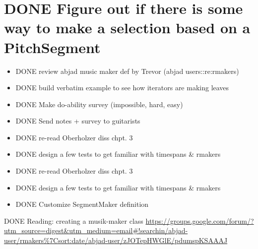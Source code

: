 \documentclass[11pt]{article}
\begin{document}
\section*{{\bfseries\sffamily DONE} Figure out if there is some way to make a selection based on a PitchSegment}
\label{sec:org51e59c8}
\begin{itemize}
\item DONE review abjad music maker def by Trevor (abjad users::re:rmakers)
\item DONE build verbatim example to see how iterators are making leaves
\end{itemize}
\begin{itemize}
\item DONE Make do-ability survey (impossible, hard, easy)
\item DONE Send notes + survey to guitarists
\end{itemize}


\begin{itemize}
\item DONE re-read Oberholzer diss chpt. 3
\item DONE design a few tests to get familiar with timespans \& rmakers
\item DONE re-read Oberholzer diss chpt. 3
\item DONE design a few tests to get familiar with timespans \& rmakers
\item DONE Customize SegmentMaker definition
\end{itemize}

DONE Reading: creating a musik-maker class
\url{https://groups.google.com/forum/?utm\_source=digest\&utm\_medium=email\#!searchin/abjad-user/rmakers\%7Csort:date/abjad-user/zJOTepHWGlE/pdumspKSAAAJ}
\end{document}
